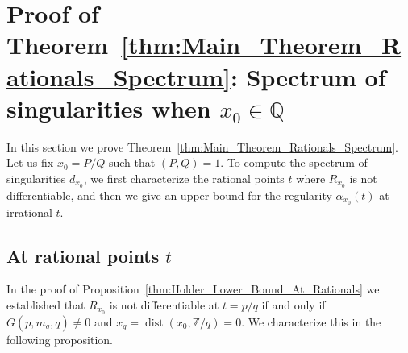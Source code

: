 \documentclass[11pt,reqno]{amsart}
\theoremstyle{definition}
\begin{document}
\section{Proof of Theorem~\ref{thm:Main_Theorem_Rationals_Spectrum}: Spectrum of singularities when $x_0 \in \mathbb Q$}
\label{sec:Rational_Holder}

In this section we prove Theorem~\ref{thm:Main_Theorem_Rationals_Spectrum}.
Let us fix $x_0 = P/Q$ such that $(P,Q) = 1$. 
To compute the spectrum of singularities $d_{x_0}$, 
we first characterize the rational points $t$ where $R_{x_0}$ is not differentiable, 
and then we give an upper bound for the regularity $\alpha_{x_0}(t)$ at irrational $t$.  


\subsection{At rational points $t$}
In the proof of Proposition~\ref{thm:Holder_Lower_Bound_At_Rationals}
we established that $R_{x_0}$ is not differentiable at $t=p/q$ if and only if
$ G(p,m_q, q) \neq 0$
and 
$x_q = \operatorname{dist} (x_0,\mathbb Z /q ) = 0$.
 We characterize this in the following proposition. 
\end{document}
